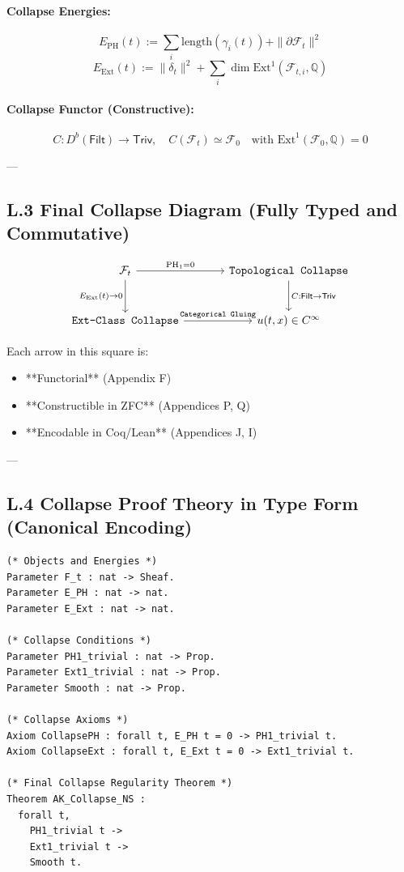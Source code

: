 \documentclass[11pt]{article}
\begin{document}
\paragraph{Collapse Energies:}
\[
E_{\mathrm{PH}}(t) := \sum_i \mathrm{length}(\gamma_i(t)) + \|\partial \mathcal{F}_t\|^2
\]
\[
E_{\mathrm{Ext}}(t) := \|\delta_t\|^2 + \sum_i \dim \mathrm{Ext}^1(\mathcal{F}_{t,i}, \mathbb{Q})
\]

\paragraph{Collapse Functor (Constructive):}
\[
C : D^b(\mathsf{Filt}) \to \mathsf{Triv}, \quad C(\mathcal{F}_t) \simeq \mathcal{F}_0
\quad \text{with } \mathrm{Ext}^1(\mathcal{F}_0, \mathbb{Q}) = 0
\]

---

\subsection*{L.3 Final Collapse Diagram (Fully Typed and Commutative)}

\[
\begin{tikzcd}[row sep=large, column sep=large]
\mathcal{F}_t
  \arrow[r, "{\mathrm{PH}_1 = 0}"]
  \arrow[d, "{E_{\mathrm{Ext}}(t) \to 0}"']
& \texttt{Topological Collapse}
  \arrow[d, "{C : \mathsf{Filt} \to \mathsf{Triv}}"] \\
\texttt{Ext-Class Collapse}
  \arrow[r, "{\texttt{Categorical Gluing}}"]
& u(t,x) \in C^\infty
\end{tikzcd}
\]

Each arrow in this square is:
\begin{itemize}
  \item **Functorial** (Appendix F)
  \item **Constructible in ZFC** (Appendices P, Q)
  \item **Encodable in Coq/Lean** (Appendices J, I)
\end{itemize}

---

\subsection*{L.4 Collapse Proof Theory in Type Form (Canonical Encoding)}

\begin{lstlisting}[language=Coq]
(* Objects and Energies *)
Parameter F_t : nat -> Sheaf.
Parameter E_PH : nat -> nat.
Parameter E_Ext : nat -> nat.

(* Collapse Conditions *)
Parameter PH1_trivial : nat -> Prop.
Parameter Ext1_trivial : nat -> Prop.
Parameter Smooth : nat -> Prop.

(* Collapse Axioms *)
Axiom CollapsePH : forall t, E_PH t = 0 -> PH1_trivial t.
Axiom CollapseExt : forall t, E_Ext t = 0 -> Ext1_trivial t.

(* Final Collapse Regularity Theorem *)
Theorem AK_Collapse_NS :
  forall t,
    PH1_trivial t ->
    Ext1_trivial t ->
    Smooth t.
\end{lstlisting}
\end{document}
